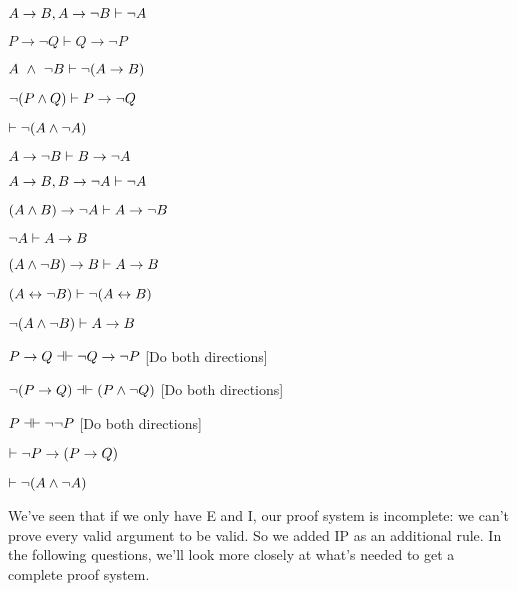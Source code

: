 \begin{earg}
\item $A\rightarrow B, A \rightarrow \neg B \vdash \neg A$
\item $P \rightarrow \lnot Q \vdash Q \rightarrow \lnot P$
\item $A \ \wedge  \ \neg B \vdash \neg (A \rightarrow B)$ %
\item $\neg (P\wedge  Q) \vdash P\rightarrow \neg Q$
\item $ \vdash \neg (A\wedge  \neg A)$
\item $A \rightarrow \neg B \vdash B \rightarrow \neg A$
\item $A \rightarrow B, B \rightarrow \neg A \vdash \neg A$
\item $(A \wedge B) \rightarrow \neg A \vdash A \rightarrow \neg B$
\item $\neg A \vdash A \rightarrow B$
\item $(A \wedge \neg B) \rightarrow B \vdash A \rightarrow B$
\item $(A\leftrightarrow \neg B) \vdash \neg (A\leftrightarrow B)$
\item $\neg (A\wedge \neg B) \vdash A \rightarrow B$
\item $P \eif Q \pequiv \enot Q \eif \enot P$ \hfill [Do both directions]
\item $\enot (P \eif Q) \pequiv (P \eand \enot Q)$ \hfill [Do both directions]
\item $P \pequiv \enot \enot P$ \hfill [Do both directions]
\item $\vdash \neg P \rightarrow( P \rightarrow Q)$
\item $\vdash \neg (A \wedge \neg A)$

\end{earg}

\problempart\label{ex-neg-prf}We've seen that if we only have \enot E and \enot I, our proof system is incomplete: we can't prove every valid argument to be valid. So we added IP as an additional rule.  In the following questions, we'll look more closely at what's needed to get a complete proof system.


